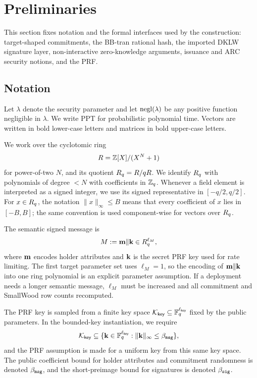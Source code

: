 \section{Preliminaries}
\label{sec:preliminaries}

This section fixes notation and the formal interfaces used by the construction: target-shaped commitments,
the BB-tran rational hash, the imported DKLW signature layer, non-interactive zero-knowledge arguments,
issuance and ARC security notions, and the PRF.

\subsection{Notation}
Let \(\lambda\) denote the security parameter and let \(\mathrm{negl}(\lambda)\) be any positive function negligible in
\(\lambda\).  We write PPT for probabilistic polynomial time.  Vectors are written in bold lower-case letters and
matrices in bold upper-case letters.

We work over the cyclotomic ring
\[
  R=\mathbb{Z}[X]/(X^N+1)
\]
for power-of-two \(N\), and its quotient \(R_q=R/qR\).  We identify \(R_q\) with polynomials of degree
\(<N\) with coefficients in \(\mathbb{Z}_q\).  Whenever a field element is interpreted as a signed integer, we use its
signed representative in \([-q/2,q/2]\).  For \(x\in R_q\), the notation \(\|x\|_\infty\le B\) means that every
coefficient of \(x\) lies in \([-B,B]\); the same convention is used component-wise for vectors over \(R_q\).

The semantic signed message is
\[
  M:=\mathbf{m}\Vert\mathbf{k}\in R_q^{\ell_M},
\]
where \(\mathbf{m}\) encodes holder attributes and \(\mathbf{k}\) is the secret PRF key used for rate limiting.  The first
target parameter set uses \(\ell_M=1\), so the encoding of \(\mathbf{m}\Vert\mathbf{k}\) into one ring polynomial is an
explicit parameter assumption.  If a deployment needs a longer semantic message, \(\ell_M\) must be increased and
all commitment and SmallWood row counts recomputed.

The PRF key is sampled from a finite key space
\(\mathcal K_{\mathsf{key}}\subseteq \mathbb{F}_q^{\ell_{\mathsf{key}}}\) fixed by the public parameters.  In the bounded-key
instantiation, we require
\[
  \mathcal K_{\mathsf{key}}\subseteq
  \{\mathbf{k}\in\mathbb{F}_q^{\ell_{\mathsf{key}}}:\|\mathbf{k}\|_\infty\le \beta_{\mathtt{msg}}\},
\]
and the PRF assumption is made for a uniform key from this same key space.  The public coefficient bound for
holder attributes and commitment randomness is denoted \(\beta_{\mathtt{msg}}\), and the short-preimage bound for signatures
is denoted \(\beta_{\mathtt{sig}}\).

